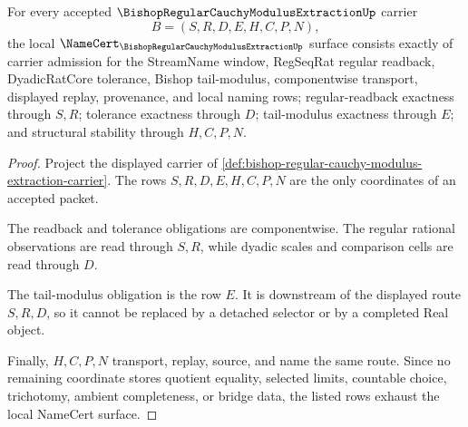 \begin{theorem}
\label{thm:bishop-regular-cauchy-modulus-extraction-namecert-obligations}
For every accepted $\BishopRegularCauchyModulusExtractionUp$ carrier
$$
B=(S,R,D,E,H,C,P,N),
$$
the local $\NameCert_{\BishopRegularCauchyModulusExtractionUp}$ surface consists exactly of carrier admission for the StreamName window, RegSeqRat regular readback, DyadicRatCore tolerance, Bishop tail-modulus, componentwise transport, displayed replay, provenance, and local naming rows; regular-readback exactness through $S,R$; tolerance exactness through $D$; tail-modulus exactness through $E$; and structural stability through $H,C,P,N$.
\end{theorem}
\begin{proof}
Project the displayed carrier of \autoref{def:bishop-regular-cauchy-modulus-extraction-carrier}. The rows $S,R,D,E,H,C,P,N$ are the only coordinates of an accepted packet.

The readback and tolerance obligations are componentwise. The regular rational observations are read through $S,R$, while dyadic scales and comparison cells are read through $D$.

The tail-modulus obligation is the row $E$. It is downstream of the displayed route $S,R,D$, so it cannot be replaced by a detached selector or by a completed Real object.

Finally, $H,C,P,N$ transport, replay, source, and name the same route. Since no remaining coordinate stores quotient equality, selected limits, countable choice, trichotomy, ambient completeness, or bridge data, the listed rows exhaust the local NameCert surface.
\end{proof}

